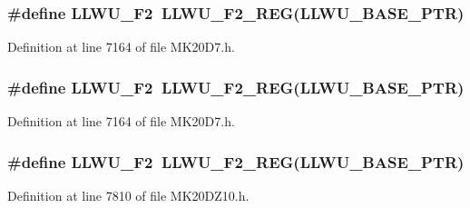 \subsubsection[{\texorpdfstring{L\+L\+W\+U\+\_\+\+F2}{LLWU_F2}}]{\setlength{\rightskip}{0pt plus 5cm}\#define L\+L\+W\+U\+\_\+\+F2~{\bf L\+L\+W\+U\+\_\+\+F2\+\_\+\+R\+EG}({\bf L\+L\+W\+U\+\_\+\+B\+A\+S\+E\+\_\+\+P\+TR})}\hypertarget{group___l_l_w_u___register___accessor___macros_gaf234482694d2528fddefe57b14eaa942}{}\label{group___l_l_w_u___register___accessor___macros_gaf234482694d2528fddefe57b14eaa942}


Definition at line 7164 of file M\+K20\+D7.\+h.

\subsubsection[{\texorpdfstring{L\+L\+W\+U\+\_\+\+F2}{LLWU_F2}}]{\setlength{\rightskip}{0pt plus 5cm}\#define L\+L\+W\+U\+\_\+\+F2~{\bf L\+L\+W\+U\+\_\+\+F2\+\_\+\+R\+EG}({\bf L\+L\+W\+U\+\_\+\+B\+A\+S\+E\+\_\+\+P\+TR})}\hypertarget{group___l_l_w_u___register___accessor___macros_gaf234482694d2528fddefe57b14eaa942}{}\label{group___l_l_w_u___register___accessor___macros_gaf234482694d2528fddefe57b14eaa942}


Definition at line 7164 of file M\+K20\+D7.\+h.

\subsubsection[{\texorpdfstring{L\+L\+W\+U\+\_\+\+F2}{LLWU_F2}}]{\setlength{\rightskip}{0pt plus 5cm}\#define L\+L\+W\+U\+\_\+\+F2~{\bf L\+L\+W\+U\+\_\+\+F2\+\_\+\+R\+EG}({\bf L\+L\+W\+U\+\_\+\+B\+A\+S\+E\+\_\+\+P\+TR})}\hypertarget{group___l_l_w_u___register___accessor___macros_gaf234482694d2528fddefe57b14eaa942}{}\label{group___l_l_w_u___register___accessor___macros_gaf234482694d2528fddefe57b14eaa942}


Definition at line 7810 of file M\+K20\+D\+Z10.\+h.

